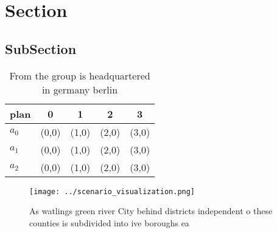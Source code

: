 \documentclass[a4paper]{article}
\begin{document}
\section{Section}

\subsection{SubSection}

\begin{table}
\begin{adjustbox}{width=0.5\columnwidth}
\begin{tabular}{|l|l|l|l|l|}
\hline
\textbf{plan} & \multicolumn{1}{c|}{\textbf{0}} & \multicolumn{1}{c|}{\textbf{1}} & \multicolumn{1}{c|}{\textbf{2}} & \multicolumn{1}{c|}{\textbf{3}} \\ \hline
\textbf{$a_0$}  & (0,0) & (1,0) & (2,0) & (3,0) \\ \hline
\textbf{$a_1$}  & (0,0) & (1,0) & (2,0) & (3,0) \\ \hline
\textbf{$a_2$}  & (0,0) & (1,0) & (2,0) & (3,0) \\ \hline
\end{tabular}
\end{adjustbox}
\caption{From the group is headquartered in germany berlin
}
\end{table}

\begin{figure}
\centering
\texttt{[image: ../scenario\_visualization.png]}
\caption{As watlings green river City behind districts independent o these counties is subdivided into ive boroughs ea
}
\end{figure}
 
\end{document}
